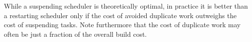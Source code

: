 \noindent
While a suspending scheduler is theoretically optimal, in practice it is better
than a restarting scheduler only if the cost of avoided duplicate work
outweighs the cost of suspending tasks. Note furthermore that the cost of
duplicate work may often be just a fraction of the overall build cost.
